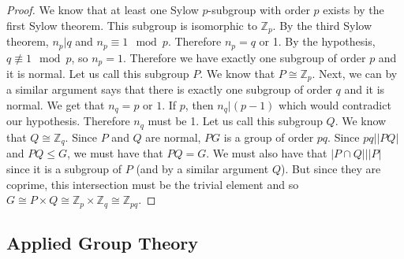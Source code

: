 \documentclass{article}
\newcommand{\Z}{\mathbb{Z}}
\theoremstyle{definition}
\begin{document}
\begin{proof}
    We know that at least one Sylow $p$-subgroup with order $p$ exists by the first Sylow theorem. This subgroup is isomorphic to $\Z_p$. By the third Sylow theorem, $n_p | q$ and $n_p \equiv 1 \mod p$. Therefore $n_p = q$ or 1. By the hypothesis, $q\not \equiv 1 \mod p$, so $n_p =1$. Therefore we have exactly one subgroup of order $p$ and it is normal. Let us call this subgroup $P$. We know that $P\cong \Z_p$. Next, we can by a similar argument says that there is exactly one subgroup of order $q$ and it is normal. We get that $n_q =p$ or $1$. If $p$, then $n_q|(p-1)$ which would contradict our hypothesis. Therefore $n_q$ must be 1. Let us call this subgroup $Q$. We know that $Q\cong \Z_q$. Since $P$ and $Q$ are normal, $PG$ is a group of order $pq$. Since $pq||PQ|$ and $PQ \leq G$, we must have that $PQ=G$. We must also have that $|P\cap Q| \big| |P|$ since it is a subgroup of $P$ (and by a similar argument $Q$). But since they are coprime, this intersection must be the trivial element and so $G \cong P \times Q \cong \Z_p \times \Z_q \cong \Z_{pq}$.
\end{proof}
\subsection{Applied Group Theory}
\end{document}
